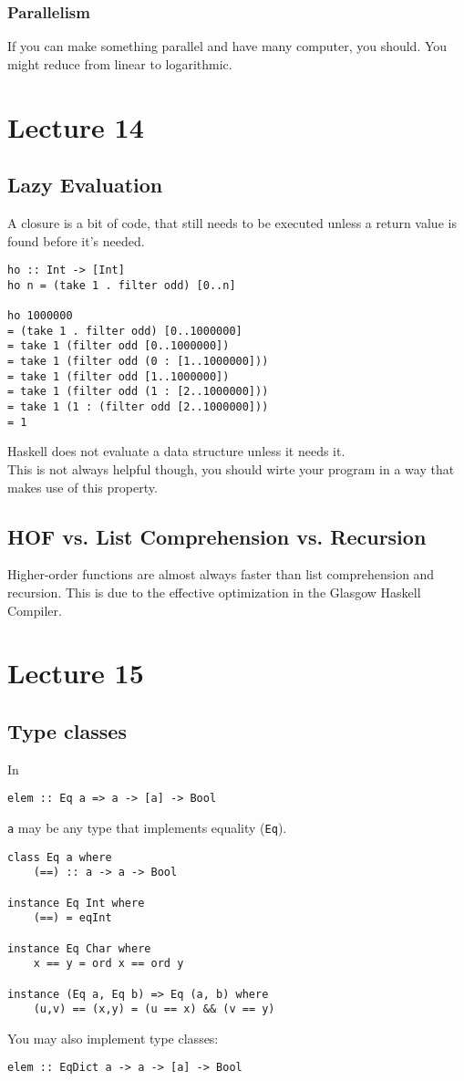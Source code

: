 \documentclass{article}
\begin{document}
\subsubsection{Parallelism}
If you can make something parallel and have many computer, you should. You might reduce from linear to logarithmic.
\section{Lecture 14}
\subsection{Lazy Evaluation}
\begin{definition}
    A closure is a bit of code, that still needs to be executed unless a return value is found before it's needed.
\end{definition}
\begin{verbatim}
ho :: Int -> [Int]
ho n = (take 1 . filter odd) [0..n]

ho 1000000
= (take 1 . filter odd) [0..1000000]
= take 1 (filter odd [0..1000000])
= take 1 (filter odd (0 : [1..1000000]))
= take 1 (filter odd [1..1000000])
= take 1 (filter odd (1 : [2..1000000]))
= take 1 (1 : (filter odd [2..1000000]))
= 1
\end{verbatim}
Haskell does not evaluate a data structure unless it needs it.\\
This is not always helpful though, you should wirte your program in a way that makes use of this property.
\subsection{HOF vs. List Comprehension vs. Recursion}
Higher-order functions are almost always faster than list comprehension and recursion. This is due to the effective optimization in the Glasgow Haskell Compiler.
\section{Lecture 15}
\subsection{Type classes}
In
\begin{verbatim}
elem :: Eq a => a -> [a] -> Bool
\end{verbatim}
\texttt{a} may be any type that implements equality (\texttt{Eq}).\\
\begin{verbatim}
class Eq a where
    (==) :: a -> a -> Bool

instance Eq Int where
    (==) = eqInt

instance Eq Char where
    x == y = ord x == ord y

instance (Eq a, Eq b) => Eq (a, b) where
    (u,v) == (x,y) = (u == x) && (v == y)
\end{verbatim}
You may also implement type classes:
\begin{verbatim}
elem :: EqDict a -> a -> [a] -> Bool
\end{verbatim}
\end{document}
